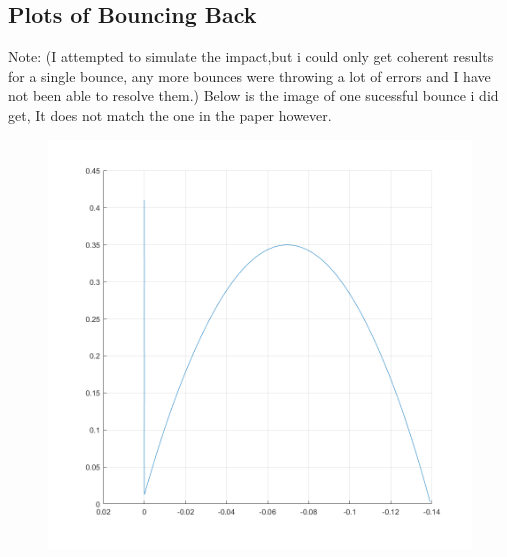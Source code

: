 \documentclass[11pt]{myclass}
\begin{document}
\subsection{\textbf{Plots of Bouncing Back}}
Note: (I attempted to simulate the impact,but i could only get coherent results for a single bounce, any more bounces were throwing a lot of errors and I have not been able to resolve them.)
Below is the image of one sucessful bounce i did get, It does not match the one in the paper however.
\begin{figure}[H]
\includegraphics[scale = 0.5]{Bouncing_back.png}
\end{figure}
\end{document}
